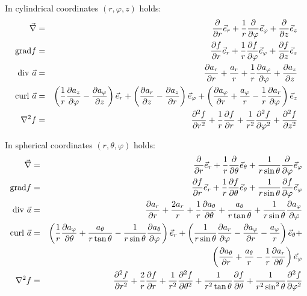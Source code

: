 \documentclass[twoside]{report}
\begin{document}
In cylindrical coordinates $(r,\varphi,z)$ holds:
\begin{eqnarray*}
\vec{\nabla}     &=&\Q{}{r}\ee{r}+\frac{1}{r}\Q{}{\varphi}\ee{\varphi}+\Q{}{z}\ee{z}\\
{\rm grad}f      &=&\Q{f}{r}\ee{r}+\frac{1}{r}\Q{f}{\varphi}\ee{\varphi}+\Q{f}{z}\ee{z}\\
{\rm div}~\vec{a}&=&\Q{a_r}{r}+\frac{a_r}{r}+\frac{1}{r}\Q{a_\varphi}{\varphi}+\Q{a_z}{z}\\
{\rm curl}~\vec{a}&=&\left(\frac{1}{r}\Q{a_z}{\varphi}-\Q{a_\varphi}{z}\right)\ee{r}+
                    \left(\Q{a_r}{z}-\Q{a_z}{r}\right)\ee{\varphi}+
                    \left(\Q{a_\varphi}{r}+\frac{a_\varphi}{r}-\frac{1}{r}\Q{a_r}{\varphi}\right)\ee{z}\\
\nabla^2 f       &=&\QQ{f}{r}+\frac{1}{r}\Q{f}{r}+\frac{1}{r^2}\QQ{f}{\varphi}+\QQ{f}{z}
\end{eqnarray*}

In spherical coordinates $(r,\theta,\varphi)$ holds:
\begin{eqnarray*}
\vec{\nabla}     &=&\Q{}{r}\ee{r}+\frac{1}{r}\Q{}{\theta}\ee{\theta}+\frac{1}{r\sin\theta}\Q{}{\varphi}\ee{\varphi}\\
{\rm grad}f      &=&\Q{f}{r}\ee{r}+\frac{1}{r}\Q{f}{\theta}\ee{\theta}+\frac{1}{r\sin\theta}\Q{f}{\varphi}\ee{\varphi}\\
{\rm div}~\vec{a}&=&\Q{a_r}{r}+\frac{2a_r}{r}+\frac{1}{r}\Q{a_\theta}{\theta}+\frac{a_\theta}{r\tan\theta}+\frac{1}{r\sin\theta}\Q{a_\varphi}{\varphi}\\
{\rm curl}~\vec{a}&=&\left(\frac{1}{r}\Q{a_\varphi}{\theta}+\frac{a_\theta}{r\tan\theta}-\frac{1}{r\sin\theta}\Q{a_\theta}{\varphi}\right)\ee{r}+
                    \left(\frac{1}{r\sin\theta}\Q{a_r}{\varphi}-\Q{a_\varphi}{r}-\frac{a_\varphi}{r}\right)\ee{\theta}+\\
                 &&\left(\Q{a_\theta}{r}+\frac{a_\theta}{r}-\frac{1}{r}\Q{a_r}{\theta}\right)\ee{\varphi}\\
\nabla^2 f       &=&\QQ{f}{r}+\frac{2}{r}\Q{f}{r}+\frac{1}{r^2}\QQ{f}{\theta}+\frac{1}{r^2\tan\theta}\Q{f}{\theta}+\frac{1}{r^2\sin^2\theta}\QQ{f}{\varphi}
\end{eqnarray*}
\end{document}
